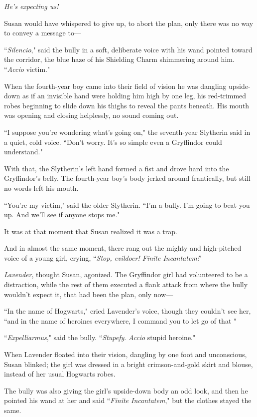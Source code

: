 \emph{He's expecting us!}

Susan would have whispered to give up, to abort the plan, only there was no way to convey a message to—

``\emph{Silencio}," said the bully in a soft, deliberate voice with his wand pointed toward the corridor, the blue haze of his Shielding Charm shimmering around him. ``\emph{Accio} victim."

When the fourth-year boy came into their field of vision he was dangling upside-down as if an invisible hand were holding him high by one leg, his red-trimmed robes beginning to slide down his thighs to reveal the pants beneath. His mouth was opening and closing helplessly, no sound coming out.

``I suppose you're wondering what's going on," the seventh-year Slytherin said in a quiet, cold voice. ``Don't worry. It's so simple even a Gryffindor could understand."

With that, the Slytherin's left hand formed a fist and drove hard into the Gryffindor's belly. The fourth-year boy's body jerked around frantically, but still no words left his mouth.

``You're my victim," said the older Slytherin. ``I'm a bully. I'm going to beat you up. And we'll see if anyone stops me."

It was at that moment that Susan realized it was a trap.

And in almost the same moment, there rang out the mighty and high-pitched voice of a young girl, crying, ``\emph{Stop, evildoer! Finite Incantatem!}"

\emph{Lavender}, thought Susan, agonized. The Gryffindor girl had volunteered to be a distraction, while the rest of them executed a flank attack from where the bully wouldn't expect it, that had been the plan, only now—

``In the name of Hogwarts," cried Lavender's voice, though they couldn't see her, ``and in the name of heroines everywhere, I command you to let go of that "

``\emph{Expelliarmus}," said the bully. ``\emph{Stupefy}. \emph{Accio} stupid heroine."

When Lavender floated into their vision, dangling by one foot and unconscious, Susan blinked; the girl was dressed in a bright crimson-and-gold skirt and blouse, instead of her usual Hogwarts robes.

The bully was also giving the girl's upside-down body an odd look, and then he pointed his wand at her and said ``\emph{Finite Incantatem}," but the clothes stayed the same.

